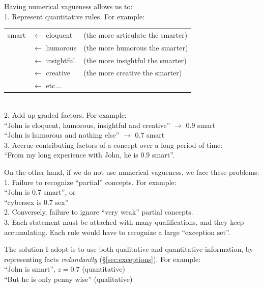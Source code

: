 Having numerical vagueness allows us to:\\
1. Represent quantitative rules.  For example:\\
\hspace*{1cm} \begin{tabular}{l l l}
smart & $\leftarrow$ eloquent    & (the more articulate the smarter)\\
      & $\leftarrow$ humorous    & (the more humorous the smarter)\\
      & $\leftarrow$ insightful  & (the more insightful the smarter)\\
      & $\leftarrow$ creative    & (the more creative the smarter)\\
      & $\leftarrow$ etc...      &
\end{tabular}\\
2. Add up graded factors.  For example:\\
\hspace*{1cm} ``John is eloquent, humorous, insightful and creative'' $\rightarrow$ 0.9 smart\\
\hspace*{1cm} ``John is humorous and nothing else'' $\rightarrow$ 0.7 smart\\
3. Accrue contributing factors of a concept over a long period of time:\\
\hspace*{1cm} ``From my long experience with John, he is 0.9 smart''.

On the other hand, if we do not use numerical vagueness, we face these problems:\\
1. Failure to recognize ``partial'' concepts.  For example:\\
\hspace*{1cm} ``John is 0.7 smart'', or\\
\hspace*{1cm} ``cybersex is 0.7 sex''\\
2. Conversely, failure to ignore ``very weak'' partial concepts.\\
3. Each statement must be attached with many qualifications, and they keep accumulating. Each rule would have to recognize a large ``exception set''.

The solution I adopt is to use both qualitative and quantitative information, by representing facts \textit{redundantly} (\S\ref{sec:exceptions}).  For example:\\
\hspace*{1cm} ``John is smart'', $z = 0.7$ (quantitative)\\
\hspace*{1cm} ``But he is only penny wise'' (qualitative)

